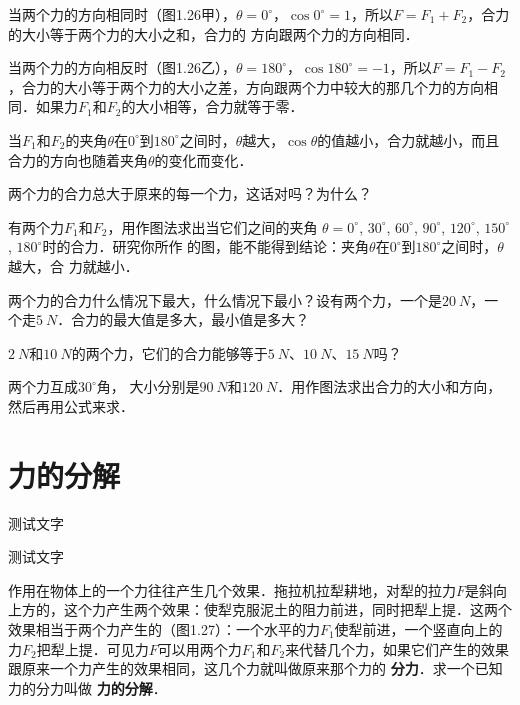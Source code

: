 当两个力的方向相同时（图1.26甲），$\theta =0^\circ$，$\cos 0^\circ=1$，所以$F=F_1+F_2$，合力的大小等于两个力的大小之和，合力的
方向跟两个力的方向相同．

当两个力的方向相反时（图1.26乙），$\theta =180^\circ$，$\cos 180^\circ=-1$，所以$F=F_1-F_2$，合力的大小等于两个力的大小之差，方向跟两个力中较大的那几个力的方向相同．如果力$F_1$和$F_2$的大小相等，合力就等于零．

当$F_1$和$F_2$的夹角$\theta$在$0^\circ$到$180^\circ$之间时，$\theta$越大，$\cos\theta$的值越小，合力就越小，而且合力的方向也随着夹角$\theta$的变化而变化．


\begin{Exercise}
	\begin{QsNum}
	    \item 两个力的合力总大于原来的每一个力，这话对吗？为什么？
	    \item 有两个力$F_1$和$F_2$，用作图法求出当它们之间的夹角
	          $\theta =0^\circ$, $30^\circ$, $60^\circ$, $90^\circ$, $120^\circ$, $150^\circ$, $180^\circ$时的合力．研究你所作
	          的图，能不能得到结论：夹角$\theta$在$0^\circ$到$180^\circ$之间时，$\theta $越大，合
	          力就越小．
	    \item 两个力的合力什么情况下最大，什么情况下最小？设有两个力，一个是$\qty{20}{N}$，一个走$\qty{5}{N}$．合力的最大值是多大，最小值是多大？
	    \item $\qty{2}{N}$和$\qty{10}{N}$的两个力，它们的合力能够等于$\qty{5}{N}$、$\qty{10}{N}$、$\qty{15}{N}$吗？
	    \item 两个力互成$30^\circ$角， 大小分别是$\qty{90}{N}$和$\qty{120}{N}$．用作图法求出合力的大小和方向，然后再用公式来求．
	   \end{QsNum}
\end{Exercise}



\section{力的分解}

\begin{Point*}
	测试文字
\end{Point*}

\begin{Case*}
	\item 测试文字
\end{Case*}

作用在物体上的一个力往往产生几个效果．拖拉机拉犁耕地，对犁的拉力$F$是斜向上方的，这个力产生两个效果：使犁克服泥土的阻力前进，同时把犁上提．这两个效果相当于两个力产生的（图1.27）：一个水平的力$F_1$使犁前进，一个竖直向上的力$F_2$把犁上提．可见力$F$可以用两个力$F_1$和$F_2$来代替几个力，如果它们产生的效果跟原来一个力产生的效果相同，这几个力就叫做原来那个力的\textbf{ 分力}．求一个已知力的分力叫做\textbf{ 力的分解}．

